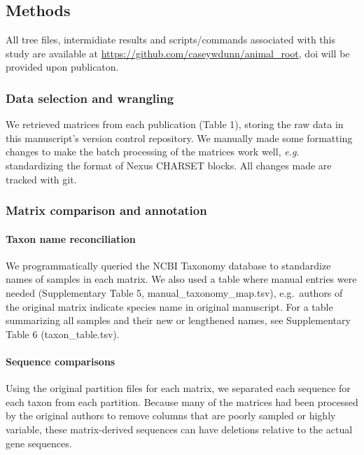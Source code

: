 \documentclass[]{article}
\let\oldparagraph\paragraph
\renewcommand{\paragraph}[1]{\oldparagraph{#1}\mbox{}}
\begin{document}
\hypertarget{methods}{%
\subsection{Methods}\label{methods}}

All tree files, intermidiate results and scripts/commands associated
with this study are available at
\url{https://github.com/caseywdunn/animal_root}, doi will be provided
upon publicaton.

\hypertarget{data-selection-and-wrangling}{%
\subsubsection{Data selection and
wrangling}\label{data-selection-and-wrangling}}

We retrieved matrices from each publication (Table 1), storing the raw
data in this manuscript's version control repository. We manually made
some formatting changes to make the batch processing of the matrices
work well, \emph{e.g.} standardizing the format of Nexus CHARSET blocks.
All changes made are tracked with git.

\hypertarget{matrix-comparison-and-annotation}{%
\subsubsection{Matrix comparison and
annotation}\label{matrix-comparison-and-annotation}}

\hypertarget{taxon-name-reconciliation}{%
\paragraph{Taxon name reconciliation}\label{taxon-name-reconciliation}}

We programmatically queried the NCBI Taxonomy database to standardize
names of samples in each matrix. We also used a table where manual
entries were needed (Supplementary Table 5, manual\_taxonomy\_map.tsv),
e.g.~authors of the original matrix indicate species name in original
manuscript. For a table summarizing all samples and their new or
lengthened names, see Supplementary Table 6 (taxon\_table.tsv).

\hypertarget{sequence-comparisons}{%
\paragraph{Sequence comparisons}\label{sequence-comparisons}}

Using the original partition files for each matrix, we separated each
sequence for each taxon from each partition. Because many of the
matrices had been processed by the original authors to remove columns
that are poorly sampled or highly variable, these matrix-derived
sequences can have deletions relative to the actual gene sequences.
\end{document}
